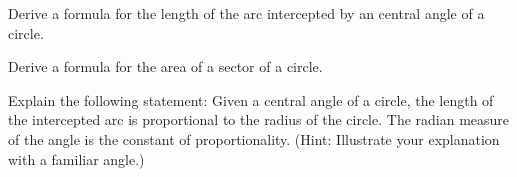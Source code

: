 \begin{prob}
Derive a formula for the length of the arc intercepted by an central angle of a circle.  
\end{prob}

\begin{prob}
Derive a formula for the area of a sector of a circle.  
\end{prob}

\begin{prob}
Explain the following statement:  Given a central angle of a circle, the length of the intercepted arc is proportional to the radius of the circle.  The radian measure of the angle is the constant of proportionality.  (Hint:  Illustrate your explanation with a familiar angle.)
\end{prob}

